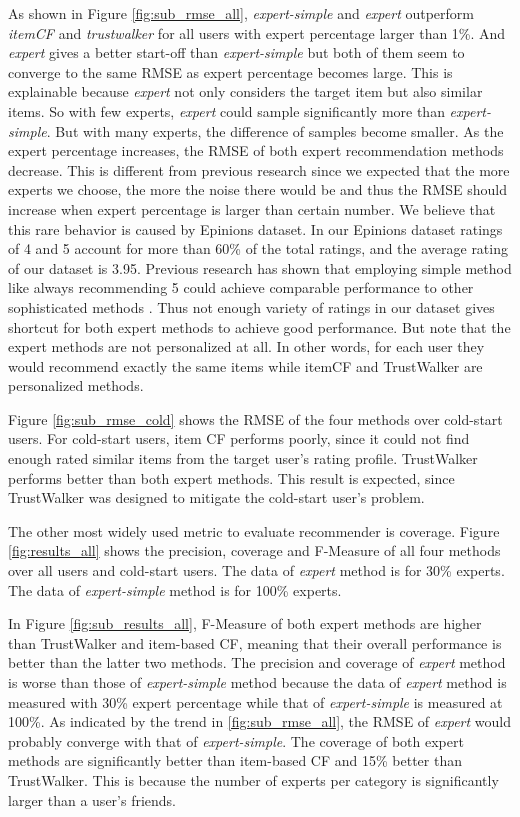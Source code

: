 \documentclass[12pt]{article}
\begin{document}
As shown in Figure \ref{fig:sub_rmse_all}, \emph{expert-simple} and \emph{expert} outperform \emph{itemCF} and \emph{trustwalker} for all users with expert percentage larger than 1\%. And \emph{expert} gives a better start-off than \emph{expert-simple} but both of them seem to converge to the same RMSE as expert percentage becomes large. This is explainable because \emph{expert} not only considers the target item but also similar items. So with few experts, \emph{expert} could sample significantly more than \emph{expert-simple}. But with many experts, the difference of samples become smaller. As the expert percentage increases, the RMSE of both expert recommendation methods decrease. This is different from previous research \cite{Sarwar:2001p433} since we expected that the more experts we choose, the more the noise there would be and thus the RMSE should increase when expert percentage is larger than certain number. We believe that this rare behavior is caused by Epinions dataset. In our Epinions dataset ratings of 4 and 5 account for more than 60\% of the total ratings, and the average rating of our dataset is 3.95. Previous research has shown that employing simple method like always recommending 5 could achieve comparable performance to other sophisticated methods \cite{Massa:2007p437}. Thus not enough variety of ratings in our dataset gives shortcut for both expert methods to achieve good performance. But note that the expert methods are not personalized at all. In other words, for each user they would recommend exactly the same items while itemCF and TrustWalker are personalized methods.


Figure \ref{fig:sub_rmse_cold} shows the RMSE of the four methods over cold-start users. For cold-start users, item CF performs poorly, since it could not find enough rated similar items from the target user's rating profile. TrustWalker performs better than both expert methods. This result is expected, since TrustWalker was designed to mitigate the cold-start user's problem.


The other most widely used metric to evaluate recommender is coverage. Figure \ref{fig:results_all} shows the precision, coverage and F-Measure of all four methods over all users and cold-start users. The data of \emph{expert} method is for 30\% experts. The data of \emph{expert-simple} method is for 100\% experts.

In Figure \ref{fig:sub_results_all}, F-Measure of both expert methods are higher than TrustWalker and item-based CF, meaning that their overall performance is better than the latter two methods. The precision and coverage of \emph{expert} method is worse than those of \emph{expert-simple} method because the data of \emph{expert} method is measured with 30\% expert percentage while that of \emph{expert-simple} is measured at 100\%. As indicated by the trend in \ref{fig:sub_rmse_all}, the RMSE of \emph{expert} would probably converge with that of \emph{expert-simple}. The coverage of both expert methods are significantly better than item-based CF and 15\% better than TrustWalker. This is because the number of experts per category is significantly larger than a user's friends.
\end{document}
